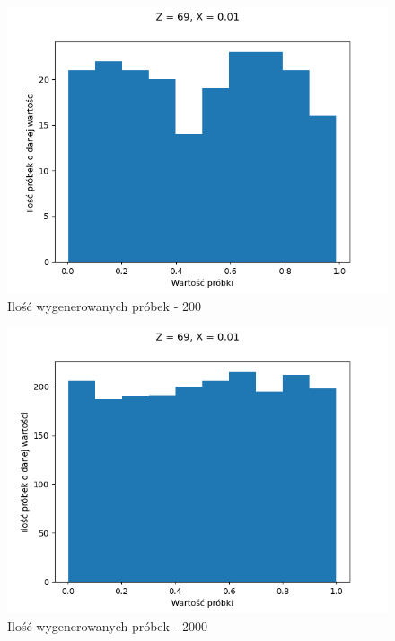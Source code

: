 \documentclass[12pt,a4paper]{article}
\begin{document}
  \begin{figure}[H]
    \centering
    \includegraphics[height=0.25\textheight]{figures/Figure_11.png}
    \caption{Ilość wygenerowanych próbek - 200}
    \label{fig:11}
  \end{figure}

  \begin{figure}[H]
    \centering
    \includegraphics[height=0.25\textheight]{figures/Figure_12.png}
    \caption{Ilość wygenerowanych próbek - 2000}
    \label{fig:12}
  \end{figure}
\end{document}
